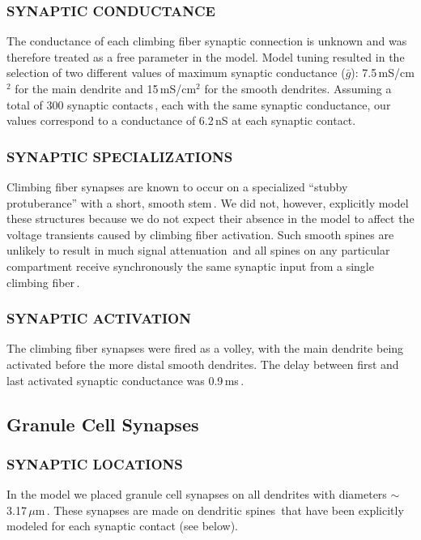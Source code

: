 \documentclass[12pt]{article}
\begin{document}
\subsubsection*{SYNAPTIC CONDUCTANCE}

The conductance of each climbing
fiber synaptic connection is unknown and was therefore treated as
a free parameter in the model. Model tuning resulted in the selection
of two different values of maximum synaptic conductance
($\bar g$): 7.5\,mS/cm$^2$ for the main dendrite and 15\,mS/cm$^2$ for the
smooth dendrites. Assuming a total of 300 synaptic contacts\,\cite{Ito:1984uq}, each with the same synaptic conductance, our values
correspond to a conductance of 6.2\,nS at each synaptic contact.

\subsubsection*{SYNAPTIC SPECIALIZATIONS}

Climbing fiber synapses are
known to occur on a specialized ``stubby protuberance'' with a
short, smooth stem\,\cite{Palay:1974fk}. We did not,
however, explicitly model these structures because we do not expect
their absence in the model to affect the voltage transients
caused by climbing fiber activation. Such smooth spines are unlikely
to result in much signal attenuation\,\cite{Rall:1990tg}
and all spines on any particular compartment receive synchronously 
the same synaptic input from a single climbing fiber\,\cite{Ito:1984uq}.

\subsubsection*{SYNAPTIC ACTIVATION}

The climbing fiber synapses were fired as
a volley, with the main dendrite being activated before the more
distal smooth dendrites. The delay between first and last activated
synaptic conductance was 0.9\,ms\,\cite{Llinas:1980vn}.

\subsection*{Granule Cell Synapses}

\subsubsection*{SYNAPTIC LOCATIONS}

In the model we placed granule cell synapses
on all dendrites with diameters $\sim$3.17\,$\mu$m\,\cite{Palay:1974fk}.
These synapses are made on dendritic spines\,\cite{M:1988bh} 
that have been explicitly modeled for each
synaptic contact (see below).
\end{document}
